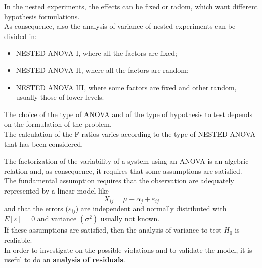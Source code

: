 \begin{frame}
  \vspace{.25cm}
  In the nested experiments, the effects can be fixed or radom, which want different hypothesis formulations.\\
  \vspace{.25cm}
  As consequence, also the analysis of variance of nested experiments can be divided in:
  \begin{itemize}
    \item NESTED ANOVA I, where all the factors are fixed;
    \item NESTED ANOVA II, where all the factors are random;
    \item NESTED ANOVA III, where some factors are fixed and other random, usually those of lower levels.
  \end{itemize}
  \vspace{.25cm}
  The choice of the type of ANOVA and of the type of hypothesis to test depends on the formulation of the problem.\\
  \vspace{.25cm}
  The calculation of the F ratios varies according to the type of NESTED ANOVA that has been considered.
\end{frame}




\begin{frame}
  The factorization of the variability of a system using an ANOVA is an algebric relation and, as consequence, it requires that some assumptions are satisfied.\\
  The fundamental assumption requires that the observation are adequately represented by a linear model like
  $$ X_{ij}=\mu+\alpha_j+\varepsilon_{ij} $$
  and that the errors ($ \varepsilon_{ij} $) are independent and normally distributed with $ E \left[ \varepsilon \right] = 0 $ and variance $(\sigma^2)$ usually not known.\\
  \vspace{0.2cm}
  If these assumptions are satisfied, then the analysis of variance to test $ H_0 $ is realiable.\\
  \vspace{0.2cm}
  In order to investigate on the possible violations and to validate the model, it is useful to do an \textbf{analysis of residuals}.
\end{frame}

